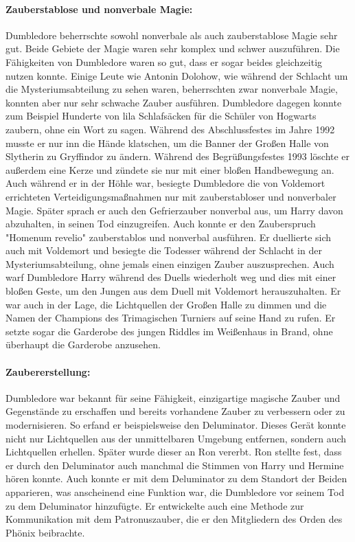 \documentclass[a4paper, 10pt]{article}
\begin{document}
\paragraph{Zauberstablose und nonverbale Magie:}
Dumbledore beherrschte sowohl nonverbale als auch zauberstablose Magie sehr gut. Beide Gebiete der Magie waren sehr komplex und schwer auszuführen. Die Fähigkeiten von Dumbledore waren so gut, dass er sogar beides gleichzeitig nutzen konnte. Einige Leute wie Antonin Dolohow, wie während der Schlacht
um die Mysteriumsabteilung zu sehen waren, beherrschten zwar nonverbale Magie, konnten aber nur sehr schwache Zauber ausführen. Dumbledore dagegen konnte zum Beispiel Hunderte von lila Schlafsäcken für die Schüler von Hogwarts zaubern, ohne ein Wort zu sagen. Während des Abschlussfestes im Jahre 1992 musste er nur inn die Hände klatschen, um die Banner der Großen Halle von Slytherin zu Gryffindor zu ändern. Während des Begrüßungsfestes 1993 löschte er außerdem eine Kerze und zündete sie nur mit einer bloßen Handbewegung an. Auch während er in der Höhle war, besiegte Dumbledore die von Voldemort errichteten Verteidigungsmaßnahmen nur mit zauberstabloser und nonverbaler Magie. Später sprach er auch den Gefrierzauber nonverbal aus, um Harry davon abzuhalten, in seinen Tod einzugreifen. Auch konnte er den Zauberspruch "Homenum revelio" zauberstablos und nonverbal ausführen. Er duellierte sich auch mit Voldemort und besiegte die Todesser während der Schlacht in der Mysteriumsabteilung, ohne jemals einen einzigen Zauber auszusprechen. Auch warf Dumbledore Harry während des Duells wiederholt weg und dies mit einer bloßen Geste, um den Jungen aus dem Duell mit Voldemort herauszuhalten. Er war auch in der Lage, die Lichtquellen der Großen Halle zu dimmen und die Namen der Champions des Trimagischen Turniers auf seine Hand zu rufen. Er setzte sogar die Garderobe des jungen Riddles im Weißenhaus in Brand, ohne überhaupt die Garderobe anzusehen.
\paragraph{Zaubererstellung:}
Dumbledore war bekannt für seine Fähigkeit, einzigartige magische Zauber und Gegenstände zu erschaffen und bereits vorhandene Zauber zu verbessern oder zu modernisieren. So erfand er beispielsweise den Deluminator. Dieses Gerät konnte nicht nur Lichtquellen aus der unmittelbaren Umgebung entfernen, sondern auch Lichtquellen erhellen. Später wurde dieser an Ron vererbt. Ron stellte fest, dass er durch den Deluminator auch manchmal die Stimmen von Harry und Hermine hören konnte. Auch konnte er mit dem Deluminator zu dem Standort der Beiden apparieren, was anscheinend eine Funktion war, die Dumbledore vor seinem Tod zu dem Deluminator hinzufügte. Er entwickelte auch eine Methode zur Kommunikation mit dem Patronuszauber, die er den Mitgliedern des Orden des Phönix beibrachte.
\end{document}
